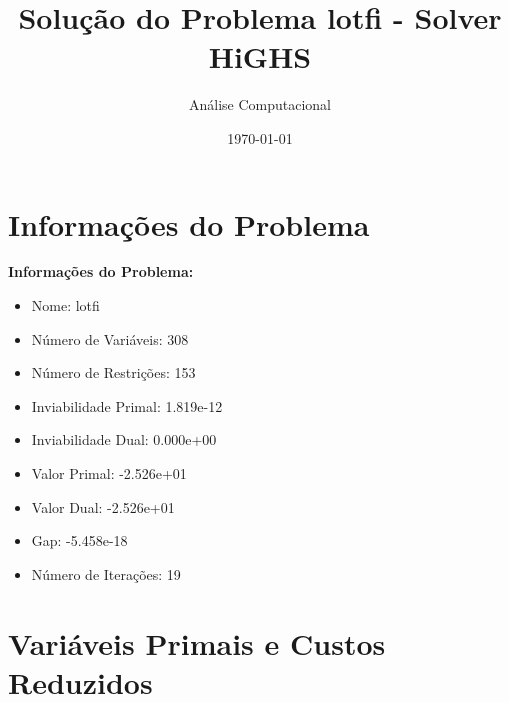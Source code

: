 \documentclass[12pt]{article}
\title{Solução do Problema lotfi - Solver HiGHS}
\author{Análise Computacional}
\date{\today}
\begin{document}
\maketitle

\section{Informações do Problema}

\textbf{Informações do Problema:}
\begin{itemize}
\item Nome: lotfi
\item Número de Variáveis: 308
\item Número de Restrições: 153
\item Inviabilidade Primal: 1.819e-12
\item Inviabilidade Dual: 0.000e+00
\item Valor Primal: -2.526e+01
\item Valor Dual: -2.526e+01
\item Gap: -5.458e-18
\item Número de Iterações: 19
\end{itemize}


\section{Variáveis Primais e Custos Reduzidos}
\end{document}
